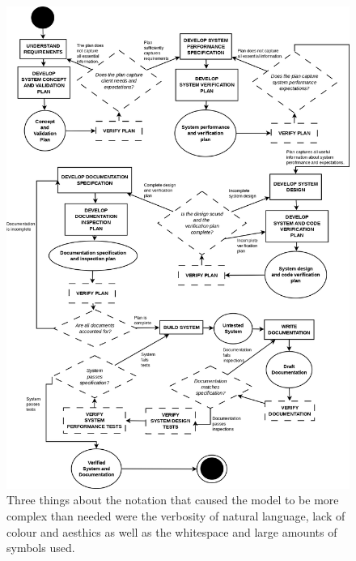 \begin{figure}
\centering
\includegraphics[scale=0.3]{media/VModel}
\caption{Three things about the notation that caused the model to be more
complex than needed were the 
verbosity of natural language,
lack of colour and aesthics as well as the 
 whitespace and large amounts of symbols used.}
\label{VModelAgain}
\end{figure}

\pagebreak

